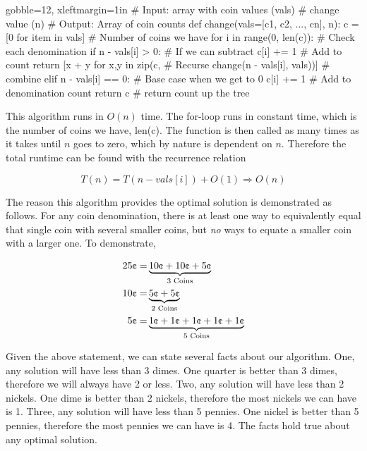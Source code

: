 \documentclass[10pt]{article}
\begin{document}
\begin{easylist}[enumerate]
        \begin{pythoncode*}{gobble=12, xleftmargin=1in}
            # Input: array with coin values (vals)
            #        change value (n)
            # Output: Array of coin counts
            def change(vals=[c1, c2, ..., cn], n):
                c = [0 for item in vals]   # Number of coins we have
                for i in range(0, len(c)): # Check each denomination
                    if n - vals[i] > 0: # If we can subtract
                        c[i] += 1  # Add to count
                        return [x + y for x,y in zip(c, # Recurse
                                change(n - vals[i], vals))] # combine
                    elif n - vals[i] == 0: # Base case when we get to 0
                        c[i] += 1 # Add to denomination count
                        return c # return count up the tree
        \end{pythoncode*}

        This algorithm runs in $O(n)$ time. The {\ttfamily for}-loop runs in constant time, which is the number of coins
        we have, {\ttfamily len(c)}. The function is then called as many times as it takes until $n$ goes to zero, which
        by nature is dependent on $n$. Therefore the total runtime can be found with the recurrence relation

        \[ T(n) = T(n - vals[i]) + O(1) \Rightarrow O(n) \]

        The reason this algorithm provides the optimal solution is demonstrated as follows. For any coin denomination,
        there is at least one way to equivalently equal that single coin with several smaller coins, but \textit{no}
        ways to equate a smaller coin with a larger one. To demonstrate,

            \[ \begin{aligned}
                25 \cents =& \underbrace{10 \cents + 10 \cents + 5 \cents}_{\text{3 Coins}}\\
                10 \cents =& \underbrace{5 \cents + 5 \cents}_{\text{2 Coins}}\\
                5 \cents  =& \underbrace{1 \cents + 1 \cents + 1 \cents + 1 \cents + 1 \cents}_{\text{5 Coins}}\\
            \end{aligned} \]

        Given the above statement, we can state several facts about our algorithm. One, any solution will have less than
        3 dimes. One quarter is better than 3 dimes, therefore we will always have 2 or less. Two, any solution will
        have less than 2 nickels. One dime is better than 2 nickels, therefore the most nickels we can have is 1. Three,
        any solution will have less than 5 pennies. One nickel is better than 5 pennies, therefore the most pennies we
        can have is 4. The facts hold true about any optimal solution.


\end{easylist}
\end{document}
